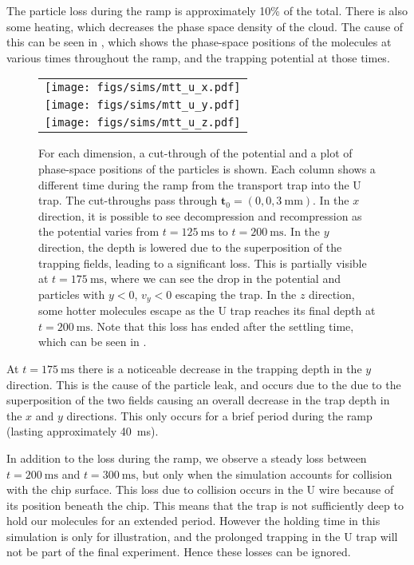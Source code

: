 The particle loss during the ramp is approximately 10\% of the total. There is
also some heating, which decreases the phase space density of the cloud. The
cause of this can be seen in , which shows the
phase-space positions of the molecules at various times throughout the ramp,
and the trapping potential at those times.

\begin{figure}[p]
\centering
  \begin{tabular}{c}
    \texttt{[image: figs/sims/mtt\_u\_x.pdf]} \\
    \texttt{[image: figs/sims/mtt\_u\_y.pdf]} \\
    \texttt{[image: figs/sims/mtt\_u\_z.pdf]}
  \end{tabular}
  \caption{
    For each dimension, a cut-through of the potential and a plot of
    phase-space positions of the particles is shown. Each column shows a
    different time during the ramp from the transport trap into the U trap. The
    cut-throughs pass through $\mathbf{t}_0 = (0, 0, \SI{3}{\milli\meter})$. In
    the $x$ direction, it is possible to see decompression and recompression as
    the potential varies from $t=\SI{125}{\milli\second}$ to
    $t=\SI{200}{\milli\second}$. In the $y$ direction, the depth is lowered due
    to the superposition of the trapping fields, leading to a significant loss.
    This is partially visible at $t=\SI{175}{\milli\second}$, where we can see
    the drop in the potential and particles with $y<0$, $v_y<0$ escaping the
    trap. In the $z$ direction, some hotter molecules escape as the U trap
    reaches its final depth at $t=\SI{200}{\milli\second}$. Note that this loss
    has ended after the settling time, which can be seen in
    .
  }
  \label{design:fig:trans_U}
\end{figure}

At $t=\SI{175}{\milli\second}$ there is a noticeable decrease in the trapping
depth in the $y$ direction. This is the cause of the particle leak, and occurs
due to the due to the superposition of the two fields causing an overall
decrease in the trap depth in the $x$ and $y$ directions. This only occurs for
a brief period during the ramp (lasting approximately \SI{40}{\milli\second}). 

In addition to the loss during the ramp, we observe a steady loss between
$t=\SI{200}{\milli\second}$ and $t=\SI{300}{\milli\second}$, but only when the
simulation accounts for collision with the chip surface. This loss due to
collision occurs in the U wire because of its position beneath the chip. This
means that the trap is not sufficiently deep to hold our molecules for an
extended period. However the holding time in this simulation is only for
illustration, and the prolonged trapping in the U trap will not be part of the
final experiment. Hence these losses can be ignored.

